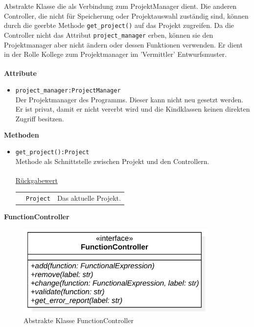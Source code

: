 \documentclass{article}
\begin{document}
Abstrakte Klasse die als Verbindung zum ProjektManager dient. Die anderen Controller, die nicht für Speicherung oder Projektauswahl zuständig sind, können durch die geerbte Methode \texttt{get\_project()} auf das Projekt zugreifen. Da die Controller nicht das Attribut \texttt{project\_manager} erben, können sie den Projektmanager aber nicht ändern oder dessen Funktionen verwenden. Er dient in der Rolle Kollege zum 
Projektmanager im 'Vermittler' Entwurfsmuster.
\\\\
\textbf{\large{Attribute}}
\begin{itemize}
\item \texttt{project\_manager:ProjectManager}\\ Der Projektmanager des Programms. Dieser kann nicht neu gesetzt werden. Er ist privat, damit er nicht vererbt wird und die Kindklassen keinen direkten Zugriff besitzen.
\end{itemize}\leavevmode\newline
\textbf{\large{Methoden}}
\begin{itemize}
\item \texttt{get\_project():Project}\\ Methode als Schnittstelle zwischen Projekt und den Controllern.\\\\
\underline{{Rückgabewert}}\\
\begin{tabular}{lll}
 & \texttt{Project} & Das aktuelle Projekt. \\
\end{tabular}
\end{itemize}



\newpage
\textbf{\large{FunctionController}}
\begin{figure}[H]%
    \centering
    \includegraphics[width=10cm]{entwurf/Floriane/FunctionController.png}
    \caption{Abstrakte Klasse FunctionController}
\end{figure}
\end{document}
